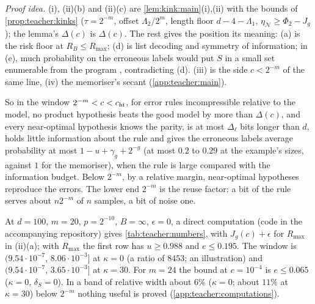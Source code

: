 \emph{Proof idea.} (i), (ii)(b) and (ii)(c) are \cref{lem:kink:main}(i),(ii) with the bounds of \cref{prop:teacher:kinks} ($\tau=2^{-m}$, offset $\Lambda_2/2^m$, length floor $d-4-\Lambda_1$, $\eta_{\mathcal N}\ge\Phi_2-J_g$); the lemma's $\Delta(c)$ is $\Delta(c)$. The rest gives the position its meaning: (a) is the risk floor at $R_B\le R_{\max}$; (d) is list decoding and symmetry of information; in (e), much probability on the erroneous labels would put $S$ in a small set enumerable from the program \citep{hoeffding1963probability}, contradicting (d). (iii) is the side $c<2^{-m}$ of the same line, (iv) the memoriser's secant (\cref{app:teacher:main}).

So in the window $2^{-m}<c<c_{\rm hi}$, for error rules incompressible relative to the model, no product hypothesis beats the good model by more than $\Delta(c)$, and every near-optimal hypothesis knows the parity, is at most $\Delta_\ell$ bits longer than $d$, holds little information about the rule and gives the erroneous labels average probability at most $1-u+\gamma_g+2^{-g}$ (at most $0.2$ to $0.29$ at the example's sizes, against $1$ for the memoriser), when the rule is large compared with the information budget. Below $2^{-m}$, by a relative margin, near-optimal hypotheses reproduce the errors. The lower end $2^{-m}$ is the reuse factor: a bit of the rule serves about $n2^{-m}$ of $n$ samples, a bit of noise one.

\begin{remark}\label{rem:teacher:numbers}
At $d=100$, $m=20$, $p=2^{-10}$, $B=\infty$, $\epsilon=0$, a direct computation (code in the accompanying repository) gives \cref{tab:teacher:numbers}, with $J_g(c)+\epsilon$ for $R_{\max}$ in (ii)(a); with $R_{\max}$ the first row has $u\ge0.988$ and $e\le0.195$. The window is $(9.54\cdot10^{-7},\,8.06\cdot10^{-3}]$ at $\kappa=0$ (a ratio of $8453$; an illustration) and $(9.54\cdot10^{-7},\,3.65\cdot10^{-3}]$ at $\kappa=30$. For $m=24$ the bound at $c=10^{-4}$ is $e\le0.065$ ($\kappa=0$, $\delta_S=0$). In a band of relative width about $6\%$ ($\kappa=0$; about $11\%$ at $\kappa=30$) below $2^{-m}$ nothing useful is proved (\cref{app:teacher:computations}).
\end{remark}

